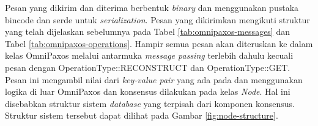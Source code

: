 Pesan yang dikirim dan diterima berbentuk \textit{binary} dan menggunakan pustaka bincode dan serde untuk \textit{serialization}. Pesan yang dikirimkan mengikuti struktur yang telah dijelaskan sebelumnya pada Tabel \ref{tab:omnipaxos-messages} dan Tabel \ref{tab:omnipaxos-operations}. Hampir semua pesan akan diteruskan ke dalam kelas OmniPaxos melalui antarmuka \textit{message passing} terlebih dahulu kecuali pesan dengan OperationType::RECONSTRUCT dan OperationType::GET. Pesan ini mengambil nilai dari \textit{key-value pair} yang ada pada  dan menggunakan logika di luar OmniPaxos dan konsensus dilakukan pada kelas \textit{Node}. Hal ini disebabkan struktur sistem \textit{database} yang terpisah dari komponen konsensus. Struktur sistem tersebut dapat dilihat pada Gambar \ref{fig:node-structure}. 
